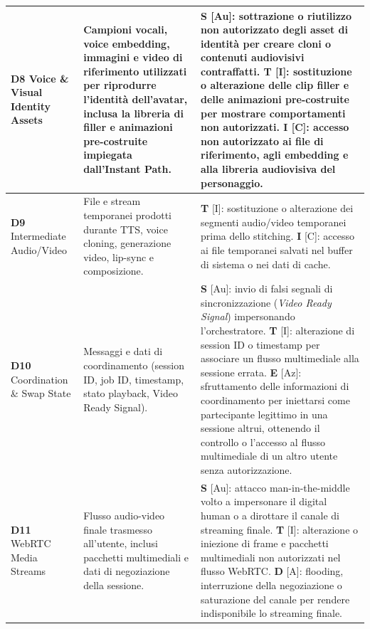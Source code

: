 \documentclass[11pt,a4paper]{article}
\begin{document}
\begin{longtable}{|C{2.8cm}|L{4.2cm}|L{\dimexpr\textwidth-2.8cm-4.2cm-6\arrayrulewidth\relax}|}
\textbf{D8} \newline Voice \& Visual Identity Assets & 
Campioni vocali, voice embedding, immagini e video di riferimento utilizzati per riprodurre l'identità dell'avatar, inclusa la libreria di filler e animazioni pre-costruite impiegata dall'Instant Path. & 
\textbf{S} [Au]: sottrazione o riutilizzo non autorizzato degli asset di identità per creare cloni o contenuti audiovisivi contraffatti. \newline \textbf{T} [I]: sostituzione o alterazione delle clip filler e delle animazioni pre-costruite per mostrare comportamenti non autorizzati. \newline \textbf{I} [C]: accesso non autorizzato ai file di riferimento, agli embedding e alla libreria audiovisiva del personaggio. \\
\hline

\textbf{D9} \newline Intermediate Audio/Video & 
File e stream temporanei prodotti durante TTS, voice cloning, generazione video, lip-sync e composizione. & 
\textbf{T} [I]: sostituzione o alterazione dei segmenti audio/video temporanei prima dello stitching. \newline \textbf{I} [C]: accesso ai file temporanei salvati nel buffer di sistema o nei dati di cache. \\
\hline

\textbf{D10} \newline Coordination \& Swap State & 
Messaggi e dati di coordinamento (session ID, job ID, timestamp, stato playback, Video Ready Signal). & 
\textbf{S} [Au]: invio di falsi segnali di sincronizzazione (\textit{Video Ready Signal}) 
impersonando l'orchestratore. \newline 
\textbf{T} [I]: alterazione di session ID o timestamp per associare un flusso 
multimediale alla sessione errata. \newline 
\textbf{E} [Az]: sfruttamento delle informazioni di coordinamento
per iniettarsi come partecipante legittimo in una sessione altrui, ottenendo il 
controllo o l'accesso al flusso multimediale di un altro utente senza autorizzazione.\\
\hline

\textbf{D11} \newline WebRTC Media Streams & 
Flusso audio-video finale trasmesso all'utente, inclusi pacchetti multimediali e dati di negoziazione della sessione. & 
\textbf{S} [Au]: attacco man-in-the-middle volto a impersonare il digital human o a dirottare il canale di streaming finale. \newline \textbf{T} [I]: alterazione o iniezione di frame e pacchetti multimediali non autorizzati nel flusso WebRTC. \newline \textbf{D} [A]: flooding, interruzione della negoziazione o saturazione del canale per rendere indisponibile lo streaming finale. \\
\hline


\end{longtable}
\end{document}
